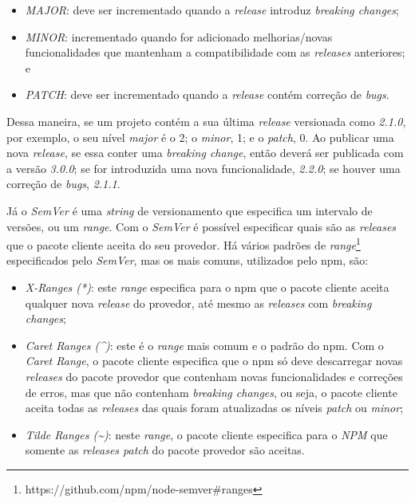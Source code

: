 \begin{itemize}
    \item \textit{MAJOR}: deve ser incrementado quando a \textit{release} introduz \textit{breaking changes};
    \item \textit{MINOR}: incrementado quando for adicionado melhorias/novas funcionalidades que mantenham a compatibilidade com as \textit{releases} anteriores; e
    \item \textit{PATCH}: deve ser incrementado quando a \textit{release} contém correção de \textit{bugs}.
\end{itemize}{}

Dessa maneira, se um projeto contém a sua última \textit{release} versionada como \textit{2.1.0}, por exemplo, o seu nível \textit{major} é o 2; o \textit{minor}, 1; e o \textit{patch}, 0. Ao publicar uma nova \textit{release}, se essa conter uma \textit{breaking change}, então deverá ser publicada com a versão \textit{3.0.0}; se for introduzida uma nova funcionalidade, \textit{2.2.0}; se houver uma correção de \textit{bugs}, \textit{2.1.1}.

Já o \textit{SemVer} é uma \textit{string} de versionamento que especifica um intervalo de versões, ou um \textit{range}. Com o \textit{SemVer} é possível especificar quais são as \textit{releases} que o pacote cliente aceita do seu provedor. Há vários padrões de \textit{range}\footnote{https://github.com/npm/node-semver\#ranges} especificados pelo \textit{SemVer}, mas os mais comuns, utilizados pelo \gls{npm}, são:

\begin{itemize}
    \item \textit{X-Ranges (*)}: este \textit{range} especifica para o \gls{npm} que o pacote cliente aceita qualquer nova \textit{release} do provedor, até mesmo as \textit{releases} com \textit{breaking changes};
    \item \textit{Caret Ranges (\textasciicircum)}: este é o \textit{range} mais comum e o padrão do \gls{npm}. Com o \textit{Caret Range}, o pacote cliente especifica que o \gls{npm} só deve descarregar novas \textit{releases} do pacote provedor que contenham novas funcionalidades e correções de erros, mas que não contenham \textit{breaking changes}, ou seja, o pacote cliente aceita todas as \textit{releases} das quais foram atualizadas os níveis \textit{patch} ou \textit{minor};
    \item \textit{Tilde Ranges (\textasciitilde)}: neste \textit{range}, o pacote cliente especifica para o \textit{NPM} que somente as \textit{releases patch} do pacote provedor são aceitas.
\end{itemize}{}

